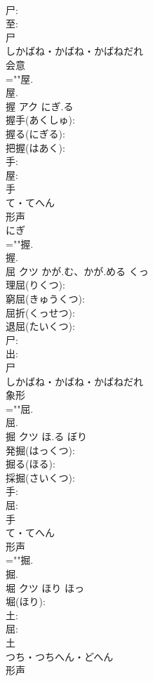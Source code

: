 \documentclass[8pt]{extreport}
\begin{document}
\begin{CJK}{UTF8}{min}
\\	尸: 
\\	至: 
\\	尸	
\\	しかばね・かばね・かばねだれ	
\\	会意 
\\	=""屋.
\\	屋.
\\	握	アク	にぎ.る		
\\	握手(あくしゅ): 
\\	握る(にぎる): 
\\	把握(はあく): 
\\	手: 
\\	屋: 
\\	手	
\\	て・てへん	
\\	形声 
\\	にぎ 
\\	=""握.
\\	握.
\\	屈	クツ	かが.む、かが.める	くっ	
\\	理屈(りくつ): 
\\	窮屈(きゅうくつ): 
\\	屈折(くっせつ): 
\\	退屈(たいくつ): 
\\	尸: 
\\	出: 
\\	尸	
\\	しかばね・かばね・かばねだれ	
\\	象形 
\\	=""屈.
\\	屈.
\\	掘	クツ	ほ.る	ぼり	
\\	発掘(はっくつ): 
\\	掘る(ほる): 
\\	採掘(さいくつ): 
\\	手: 
\\	屈: 
\\	手	
\\	て・てへん	
\\	形声 
\\	=""掘.
\\	掘.
\\	堀	クツ	ほり	ほっ	
\\	堀(ほり): 
\\	土: 
\\	屈: 
\\	土	
\\	つち・つちへん・どへん	
\\	形声 

\end{CJK}
\end{document}
